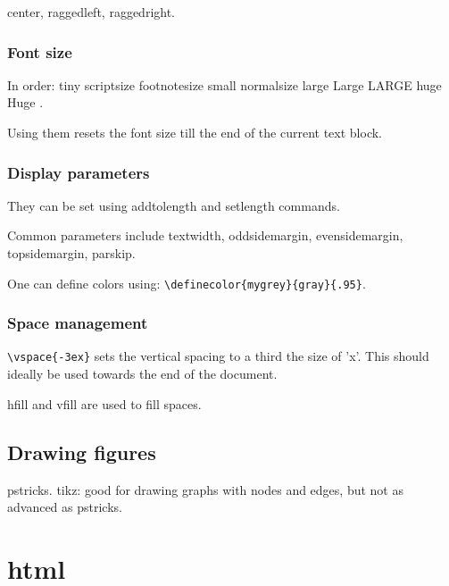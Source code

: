 \documentclass[oneside, article]{memoir}
\begin{document}
center, raggedleft, raggedright.

\subsection{Font size}
In order:     tiny
    scriptsize
    footnotesize
    small
    normalsize
    large
    Large
    LARGE
    huge
    Huge .

Using them resets the font size till the end of the current text block.

\subsection{Display parameters}
They can be set using addtolength and setlength commands.

Common parameters include textwidth, oddsidemargin, evensidemargin, topsidemargin, parskip.

One can define colors using: \verb'\definecolor{mygrey}{gray}{.95}'.

\subsection{Space management}
\verb'\vspace{-3ex}' sets the vertical spacing to a third the size of 'x'. This should ideally be used towards the end of the document.

hfill and vfill are used to fill spaces.

\section{Drawing figures}
pstricks. tikz: good for drawing graphs with nodes and edges, but not as advanced as pstricks.

\chapter{html}



% 
% 
\end{document}
